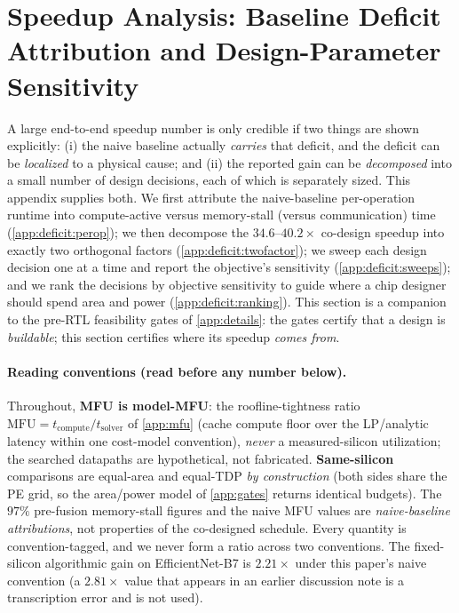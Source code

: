 \newpage
\section{Speedup Analysis: Baseline Deficit Attribution and Design-Parameter Sensitivity}
\label{app:deficit}

A large end-to-end speedup number is only credible if two things are shown
explicitly: (i) the naive baseline actually \emph{carries} that deficit, and
the deficit can be \emph{localized} to a physical cause; and (ii) the reported
gain can be \emph{decomposed} into a small number of design decisions, each of
which is separately sized. This appendix supplies both. We first attribute the
naive-baseline per-operation runtime into compute-active versus memory-stall
(versus communication) time (\cref{app:deficit:perop}); we then decompose the
$34.6$--$40.2\times$ co-design speedup into exactly two orthogonal factors
(\cref{app:deficit:twofactor}); we sweep each design decision one at a time and
report the objective's sensitivity (\cref{app:deficit:sweeps}); and we rank the
decisions by objective sensitivity to guide where a chip designer should spend area
and power (\cref{app:deficit:ranking}). This section is a companion to the
pre-RTL feasibility gates of \cref{app:details}: the gates certify that a design
is \emph{buildable}; this section certifies where its speedup \emph{comes from}.

\paragraph{Reading conventions (read before any number below).}
Throughout, \textbf{MFU is model-MFU}: the roofline-tightness ratio
$\mathrm{MFU}=t_{\mathrm{compute}}/t_{\mathrm{solver}}$ of \cref{app:mfu}
(cache compute floor over the LP/analytic latency within one cost-model
convention), \emph{never} a measured-silicon utilization; the searched
datapaths are hypothetical, not fabricated. \textbf{Same-silicon} comparisons
are equal-area and equal-TDP \emph{by construction} (both sides share the PE
grid, so the area/power model of \cref{app:gates} returns identical budgets).
The $97\%$ pre-fusion memory-stall figures and the naive MFU values are
\emph{naive-baseline attributions}, not properties of the co-designed schedule.
Every quantity is convention-tagged, and we never form a ratio across two
conventions. The fixed-silicon algorithmic gain on EfficientNet-B7 is
$2.21\times$ under this paper's naive convention (a $2.81\times$ value that
appears in an earlier discussion note is a transcription error and is not used).


